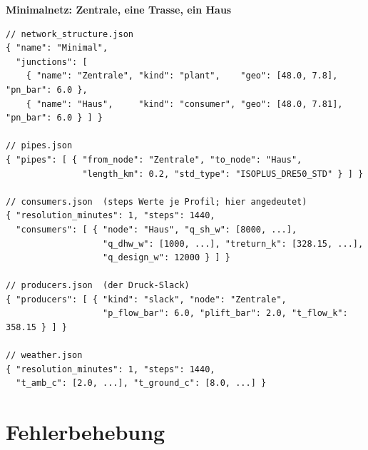 \documentclass[11pt,a4paper,parskip=half]{scrreprt}
\newenvironment{beispiel}[1][Beispiel]
  {\par\medskip{\color{bsp}\hrule height 0.8pt}\nopagebreak\smallskip
   \noindent\textbf{\textsf{\textcolor{bsp}{#1}}}\quad\ignorespaces}
  {\par\nopagebreak\smallskip{\color{bsp}\hrule height 0.8pt}\par\medskip}
\begin{document}
\begin{beispiel}[Minimalnetz: Zentrale, eine Trasse, ein Haus]
\begin{lstlisting}
// network_structure.json
{ "name": "Minimal",
  "junctions": [
    { "name": "Zentrale", "kind": "plant",    "geo": [48.0, 7.8], "pn_bar": 6.0 },
    { "name": "Haus",     "kind": "consumer", "geo": [48.0, 7.81], "pn_bar": 6.0 } ] }

// pipes.json
{ "pipes": [ { "from_node": "Zentrale", "to_node": "Haus",
               "length_km": 0.2, "std_type": "ISOPLUS_DRE50_STD" } ] }

// consumers.json  (steps Werte je Profil; hier angedeutet)
{ "resolution_minutes": 1, "steps": 1440,
  "consumers": [ { "node": "Haus", "q_sh_w": [8000, ...],
                   "q_dhw_w": [1000, ...], "treturn_k": [328.15, ...],
                   "q_design_w": 12000 } ] }

// producers.json  (der Druck-Slack)
{ "producers": [ { "kind": "slack", "node": "Zentrale",
                   "p_flow_bar": 6.0, "plift_bar": 2.0, "t_flow_k": 358.15 } ] }

// weather.json
{ "resolution_minutes": 1, "steps": 1440,
  "t_amb_c": [2.0, ...], "t_ground_c": [8.0, ...] }
\end{lstlisting}
\end{beispiel}

\chapter{Fehlerbehebung}
\label{app:fehler}
\label{sec:fehler}
\end{document}
